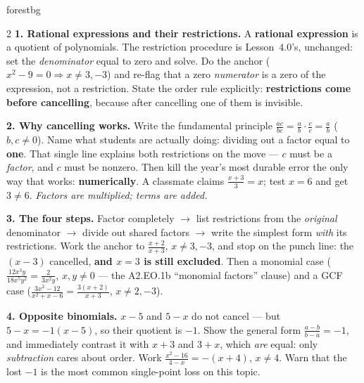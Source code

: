 \documentclass[10pt]{article}
\begin{document}
\begin{skillbox}[Lesson]{forestbg}
\begin{multicols}{2}
\textbf{1. Rational expressions and their restrictions.} A \textbf{rational expression} is a quotient
of polynomials. The restriction procedure is Lesson~4.0's, unchanged: set the \emph{denominator} equal
to zero and solve. Do the anchor ($x^2-9=0\Rightarrow x\neq3,-3$) and re-flag that a zero
\emph{numerator} is a zero of the expression, not a restriction. State the order rule explicitly:
\textbf{restrictions come before cancelling}, because after cancelling one of them is invisible.

\textbf{2. Why cancelling works.} Write the fundamental principle
$\frac{ac}{bc}=\frac ab\cdot\frac cc=\frac ab$ ($b,c\neq0$). Name what students are actually doing:
dividing out a factor equal to \textbf{one}. That single line explains both restrictions on the move
--- $c$ must be a \emph{factor}, and $c$ must be nonzero. Then kill the year's most durable error the
only way that works: \textbf{numerically}. A classmate claims $\frac{x+3}{3}=x$; test $x=6$ and get
$3\neq6$. \emph{Factors are multiplied; terms are added.}

\textbf{3. The four steps.} Factor completely $\rightarrow$ list restrictions from the \emph{original}
denominator $\rightarrow$ divide out shared factors $\rightarrow$ write the simplest form \emph{with}
its restrictions. Work the anchor to $\frac{x+2}{x+3}$, $x\neq3,-3$, and stop on the punch line: the
$(x-3)$ cancelled, \textbf{and $x=3$ is still excluded}. Then a monomial case
($\frac{12x^3y}{18x^5y^2}=\frac{2}{3x^2y}$, $x,y\neq0$ --- the A2.EO.1b ``monomial factors'' clause)
and a GCF case ($\frac{3x^2-12}{x^2+x-6}=\frac{3(x+2)}{x+3}$, $x\neq2,-3$).

\columnbreak

\textbf{4. Opposite binomials.} $x-5$ and $5-x$ do not cancel --- but $5-x=-1(x-5)$, so their quotient
is $-1$. Show the general form $\frac{a-b}{b-a}=-1$, and immediately contrast it with $x+3$ and $3+x$,
which \emph{are} equal: only \emph{subtraction} cares about order. Work
$\frac{x^2-16}{4-x}=-(x+4)$, $x\neq4$. Warn that the lost $-1$ is the most common single-point loss on
this topic.


\end{multicols}
\end{skillbox}
\end{document}
